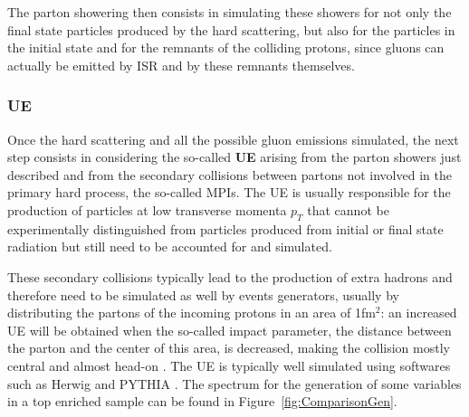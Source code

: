 \documentclass[a4paper, 10pt, openright]{report}
\begin{document}
The parton showering then consists in simulating these showers for not only the final state particles produced by the hard scattering, but also for the particles in the initial state and for the remnants of the colliding protons, since gluons can actually be emitted by \acf{ISR} and by these remnants themselves.

\subsubsection*{\acf{UE}}

Once the hard scattering and all the possible gluon emissions simulated, the next step consists in considering the so-called \textbf{\acf{UE}} arising from the parton showers just described and from the secondary collisions between partons not involved in the primary hard process, the so-called \acp{MPI}. The \ac{UE} is usually responsible for the production of particles at low transverse momenta $p_T$ that cannot be experimentally distinguished from particles produced from initial or final state radiation but still need to be accounted for and simulated.

These secondary collisions typically lead to the production of extra hadrons and therefore need to be simulated as well by events generators, usually by distributing the partons of the incoming protons in an area of 1fm$^2$: an increased \ac{UE} will be obtained when the so-called impact parameter, the distance between the parton and the center of this area, is decreased, making the collision mostly central and almost head-on \cite{UE}. The \ac{UE} is typically well simulated using softwares such as Herwig \cite{Herwig} and PYTHIA \cite{PYTHIA}. The spectrum for the generation of some variables in a top enriched sample can be found in Figure~\ref{fig:ComparisonGen}.
\end{document}
